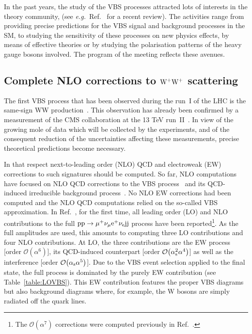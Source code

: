 In the past years, the study of the VBS processes attracted lots of interests in the theory community, (see \emph{e.g.}\ Ref.~\cite{Rauch:2016pai} for 
a recent review).
The activities range from providing precise predictions for the VBS signal and background processes in the SM, to studying the sensitivity of these 
processes on new physics effects, by means of effective theories or by studying the polarisation patterns of the heavy gauge bosons involved.
The program of the meeting reflects these avenues.

\subsection{Complete NLO corrections to ${\rm W^+ W^+}$ scattering}

The first VBS process that has been observed during the run~I of the LHC is the same-sign WW production~\cite{Aad:2014zda,Aaboud:2016ffv,Khachatryan:2014sta}.
This observation has already been confirmed by a measurement of the CMS collaboration at the 13 TeV run~II~\cite{CMS:2017adb}.
In view of the growing mole of data which will be collected by the experiments, and of the consequent reduction of the uncertainties affecting these measurements, precise theoretical predictions become necessary.

In that respect next-to-leading order (NLO) QCD and electroweak (EW) corrections to such signatures should be computed.
So far, NLO computations have focused on NLO QCD corrections to the VBS process~\cite{Jager:2009xx,Jager:2011ms,Denner:2012dz,Rauch:2016pai} and its QCD-induced irreducible background process~\cite{Melia:2010bm,Melia:2011gk,Campanario:2013gea,Baglio:2014uba,Rauch:2016pai}.
No NLO EW corrections had been computed and the NLO QCD computations relied on the so-called VBS approximation.
In Ref.~\cite{Biedermann:2017bss}, for the first time, all leading order (LO) and NLO contributions to the full ${\rm p}{\rm p}\to\mu^+\nu_\mu{\rm e}^+\nu_{\rm e}{\rm j}{\rm j}$ process have been reported\footnote{The $\mathcal{O}{\left(\alpha^{7}\right)}$ corrections
were computed previously in Ref.~\cite{Biedermann:2016yds}.}.
As the full amplitudes are used, this amounts to computing three LO contributions and four NLO contributions.
At LO, the three contributions are the EW process [order $\mathcal{O}{\left(\alpha^{6}\right)}$], its QCD-induced counterpart [order $\mathcal{O}{\left(\alpha_{\rm s}^2\alpha^{4}\right)}$] as well as the interference [order $\mathcal{O}{\left(\alpha_{\rm s}\alpha^{5}\right)}$].
Due to the VBS event selection applied to the final state, the full process is dominated by the purely EW contribution (see Table~\ref{table:LOVBS}).
This EW contribution features the proper VBS diagrams but also background diagrams where, for example, the W bosons are simply radiated off the quark lines.

